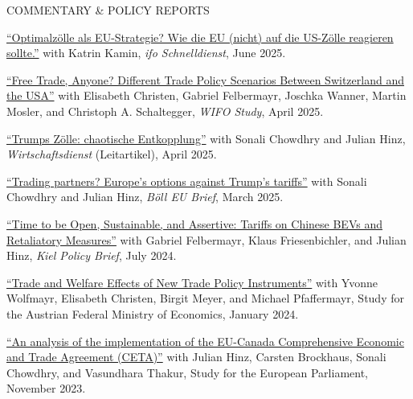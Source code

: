\documentclass{article}
\begin{document}
\begin{minipage}[t]{0.12\textwidth}
    {\selectfont COMMENTARY \& POLICY REPORTS} \\
\end{minipage}
\hspace{5mm}
\begin{minipage}[t]{0.8\textwidth}
  \href{https://www.ifo.de/DocDL/sd-2025-06-zdg-kamin-mahlkow-welthandel-am-abgrund.pdf}{``Optimalzölle als EU-Strategie? Wie die EU (nicht) auf die US-Zölle reagieren sollte.''} with Katrin Kamin, \textit{ifo Schnelldienst}, June 2025.\par
  \href{https://www.wifo.ac.at/publication/pid/57956826}{``Free Trade, Anyone?
Different Trade Policy Scenarios Between Switzerland and the USA''} with Elisabeth Christen, Gabriel Felbermayr, 
Joschka Wanner, Martin Mosler, and Christoph A. Schaltegger, \textit{WIFO Study}, April 2025.\par
  \href{https://www.wirtschaftsdienst.eu/inhalt/jahr/2025/heft/4/beitrag/trumps-zoelle-chaotische-entkopplung.html}{``Trumps Zölle: chaotische Entkopplung''} with Sonali Chowdhry and Julian Hinz, \textit{Wirtschaftsdienst} (Leitartikel), April 2025.\par
    \href{https://eu.boell.org/sites/default/files/2025-03/2025_hbs_eu_policy_brief_trade_final.pdf}{``Trading partners? Europe's options against Trump's tariffs''} with Sonali Chowdhry and Julian Hinz, \textit{Böll EU Brief}, March 2025.\par
    \href{https://www.ifw-kiel.de/publications/time-to-be-open-sustainable-and-assertive-tariffs-on-chinese-bevs-and-retaliatory-measures-33083/}{``Time to be Open, Sustainable, and Assertive: Tariffs on Chinese BEVs and Retaliatory Measures''} with Gabriel Felbermayr, Klaus Friesenbichler, and Julian Hinz, \textit{Kiel Policy Brief}, July 2024.\par
    \href{https://www.fiw.ac.at/publications/trade-and-welfare-effects-of-new-trade-policy-instruments/}{``Trade and Welfare Effects of New Trade Policy Instruments''} with Yvonne Wolfmayr, Elisabeth Christen, Birgit Meyer, and Michael Pfaffermayr, Study for the Austrian Federal Ministry of Economics, January 2024.\par
    \href{https://www.europarl.europa.eu/RegData/etudes/IDAN/2023/754440/EXPO_IDA(2023)754440_EN.pdf}{``An analysis of the implementation of the EU-Canada Comprehensive Economic and Trade Agreement (CETA)''} with Julian Hinz, Carsten Brockhaus, Sonali Chowdhry, and Vasundhara Thakur, Study for the European Parliament, November 2023. \par

\end{minipage}
\end{document}

